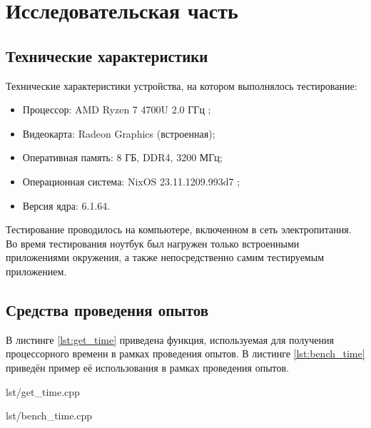 \section{Исследовательская часть}


\subsection{Технические характеристики}

Технические характеристики устройства, на котором выполнялось тестирование:
\begin{itemize}
    \item Процессор: AMD Ryzen 7 4700U 2.0 ГГц \cite{amd};
    \item Видеокарта: Radeon Graphics (встроенная);
    \item Оперативная память: 8 ГБ, DDR4, 3200 МГц;
    \item Операционная система: NixOS 23.11.1209.993d7 \cite{nixos};
    \item Версия ядра: 6.1.64.
\end{itemize}

Тестирование проводилось на компьютере, включенном в сеть электропитания.
Во время тестирования ноутбук был нагружен только встроенными приложениями окружения, а также непосредственно самим тестируемым приложением.

\subsection{Средства проведения опытов}

В листинге \ref{lst:get_time} приведена функция, используемая для получения процессорного времени в рамках проведения опытов. В листинге \ref{lst:bench_time} приведён пример её использования в рамках проведения опытов.

\begin{code}
    \begin{lstinputlisting}[
            label={lst:get_time},
            caption={Функция получения процессорного времени},
        ]{lst/get_time.cpp}
    \end{lstinputlisting}
\end{code}

\begin{code}
    \begin{lstinputlisting}[
            label={lst:bench_time},
            caption={Проведение замеров времени},
        ]{lst/bench_time.cpp}
    \end{lstinputlisting}
\end{code}

